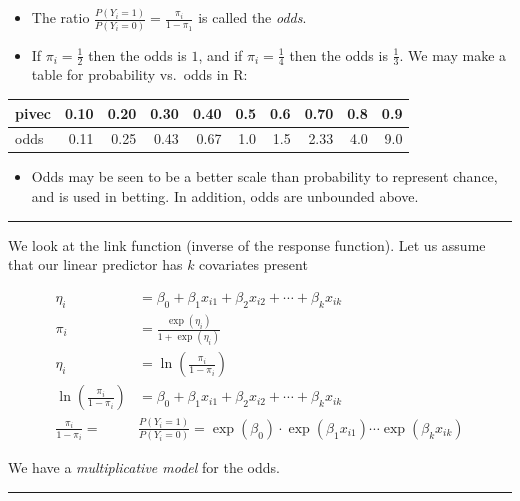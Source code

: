 \documentclass[
  letterpaper,
  DIV=11,
  numbers=noendperiod]{scrartcl}
\providecommand{\tightlist}{%
  \setlength{\itemsep}{0pt}\setlength{\parskip}{0pt}}\usepackage{longtable,booktabs,array}
\begin{document}
\begin{itemize}
\item
  The ratio \(\frac{P(Y_i=1)}{P(Y_i=0)}=\frac{\pi_i}{1-\pi_1}\) is
  called the \emph{odds}.
\item
  If \(\pi_i=\frac{1}{2}\) then the odds is \(1\), and if
  \(\pi_i=\frac{1}{4}\) then the odds is \(\frac{1}{3}\). We may make a
  table for probability vs.~odds in R:
\end{itemize}

\begin{table}
\centering
\begin{tabular}{l|r|r|r|r|r|r|r|r|r}
\hline
pivec & 0.10 & 0.20 & 0.30 & 0.40 & 0.5 & 0.6 & 0.70 & 0.8 & 0.9\\
\hline
odds & 0.11 & 0.25 & 0.43 & 0.67 & 1.0 & 1.5 & 2.33 & 4.0 & 9.0\\
\hline
\end{tabular}
\end{table}

\begin{itemize}
\tightlist
\item
  Odds may be seen to be a better scale than probability to represent
  chance, and is used in betting. In addition, odds are unbounded above.
\end{itemize}

\begin{center}\rule{0.5\linewidth}{0.5pt}\end{center}

We look at the link function (inverse of the response function). Let us
assume that our linear predictor has \(k\) covariates present

\begin{align*}
\eta_i&= \beta_0+\beta_1 x_{i1}+\beta_2 x_{i2}+\cdots + \beta_k x_{ik}\\
\pi_i&= \frac{\exp(\eta_i)}{1+\exp(\eta_i)}\\
\eta_i&=\ln(\frac{\pi_i}{1-\pi_i})\\
\ln(\frac{\pi_i}{1-\pi_i})&=\beta_0+\beta_1 x_{i1}+\beta_2 x_{i2}+\cdots + \beta_k x_{ik}\\
\frac{\pi_i}{1-\pi_i}=&\frac{P(Y_i=1)}{P(Y_i=0)}=\exp(\beta_0)\cdot \exp(\beta_1 x_{i1})\cdots\exp(\beta_k x_{ik})
\end{align*}

We have a \emph{multiplicative model} for the odds.

\begin{center}\rule{0.5\linewidth}{0.5pt}\end{center}
\end{document}
